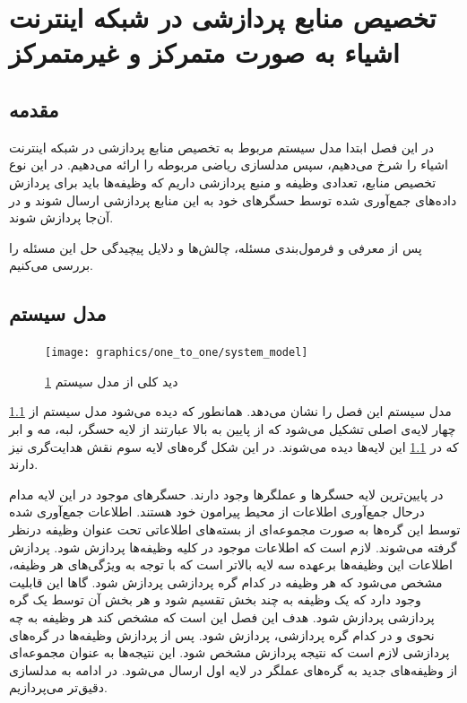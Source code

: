 \chapter{تخصیص منابع پردازشی در شبکه اینترنت اشیاء به صورت متمرکز و غیرمتمرکز}\label{chap:3-system_model_centralized_decentralized}
  \thispagestyle{empty}
  \section{مقدمه}
	در این فصل ابتدا مدل سیستم مربوط به تخصیص منابع پردازشی در شبکه اینترنت اشیاء را شرخ می‌دهیم، سپس مدلسازی ریاضی مربوطه را ارائه می‌دهیم.
    در این نوع تخصیص منابع، تعدادی وظیفه و منبع پردازشی داریم که وظیفه‌ها باید برای پردازش داده‌های جمع‌آوری شده توسط حسگر‌های خود به این منابع پردازشی ارسال شوند و در آن‌جا پردازش شوند.

    پس از معرفی و فرمول‌بندی مسئله، چالش‌ها و دلایل پیچیدگی حل این مسئله را بررسی می‌کنیم.
  \section{مدل سیستم}
    \begin{figure}[h]
      \centerline{\texttt{[image: graphics/one\_to\_one/system\_model]}}
      \caption{دید کلی از مدل سیستم \cref{chap:3-system_model_centralized_decentralized}}
      \label{fig:system_model}
    \end{figure}

	    \cref{fig:system_model} مدل سیستم این فصل را نشان می‌دهد.
	    همانطور که دیده می‌شود مدل سیستم از چهار لایه‌ی اصلی تشکیل می‌شود که از پایین به بالا عبارتند از لایه حسگر، لبه، مه و ابر که در \cref{fig:system_model} این لایه‌ها دیده می‌شوند. در این شکل گره‌های لایه سوم نقش هدایت‌گری نیز دارند.
	    
	در پایین‌ترین لایه حسگرها و عملگرها وجود دارند. حسگرهای موجود در این لایه مدام درحال جمع‌آوری اطلاعات از محیط پیرامون خود هستند. اطلاعات جمع‌آوری شده توسط این گره‌ها به صورت مجموعه‌ای از بسته‌های اطلاعاتی تحت عنوان وظیفه درنظر گرفته می‌شوند. 
	لازم است که اطلاعات موجود در کلیه وظیفه‌ها پردازش شود. پردازش اطلاعات این وظیفه‌ها برعهده سه لایه بالاتر است که با توجه به ویژگی‌های هر وظیفه، مشخص می‌شود که هر وظیفه در کدام گره پردازشی پردازش شود. گاها این قابلیت وجود دارد که یک وظیفه به چند بخش تقسیم شود و هر بخش آن توسط یک گره پردازشی پردازش شود. هدف این فصل این است که مشخص کند هر وظیفه به چه نحوی و در کدام گره پردازشی، پردازش شود. پس از پردازش وظیفه‌ها در گره‌های پردازشی لازم است که نتیجه پردازش مشخص شود. این نتیجه‌ها به عنوان مجموعه‌ای از وظیفه‌های جدید به گره‌های عملگر در لایه اول ارسال می‌شود. در ادامه به مدلسازی دقیق‌تر می‌پردازیم.
	

